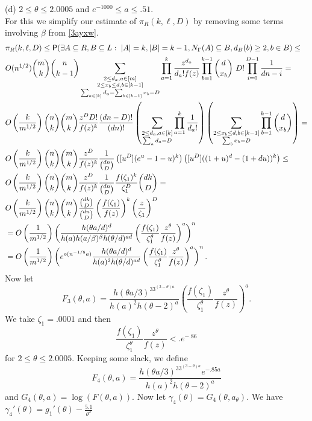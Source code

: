 \documentclass[11pt]{article}
\def\b{\beta}
\def\g{\gamma}
\def\G{\Gamma}
\def\z{\zeta}
\def\th{\theta}
\def\p{\pi}
\def\Pr{{\sf P}}
\newcommand{\brac}[1]{\left(#1\right)}
\newcommand{\bfrac}[2]{\brac{\frac{#1}{#2}}}
\begin{document}
(d) $2\leq \th\leq 2.0005$ and $e^{-1000}\leq a\leq .51$.\\ 
For this we simplify our estimate of $\p_R(k,\ell,D)$ by removing some terms involving $\b$ from \eqref{3ayxw}.
\begin{align}
&\p_R(k,\ell,D)\leq\Pr(\exists A\subseteq R,B\subseteq L:\;|A|=k,|B|=k-1,N_\G(A)\subseteq B,d_B(b)\geq 2,b\in B)\leq \nonumber\\
&O(n^{1/2})\binom{m}{k}\binom{n}{k-1}\sum_{\substack{2\leq  d_a,a\in[m]\\2\leq x_b\leq d,b\in[k-1]\\
\sum_{a\in [k]}d_a=\sum_{b\in [k-1]}x_b=D}}\prod_{a=1}^k\frac{z^{d_a}}{d_a!f(z)}
\prod_{b=1}^{k-1}\binom{d}{x_b}\ D!\prod_{i=0}^{D-1}\frac{1}{dn-i}=\nonumber\\
&O\bfrac{k}{m^{1/2}}\binom{n}{k}\binom{m}{k}\frac{z^{D}D!}{f(z)^k}\frac{(dn-D)!}{(dn)!}
\brac{\sum_{\substack{2\leq  d_a,a\in[k]\\\sum_ad_a=D}}\prod_{a=1}^k\frac{1}{d_a!}}
\brac{\sum_{\substack{2\leq x_b\leq d,b\in[k-1]\\\sum_bx_b=D}}\prod_{b=1}^{k-1}\binom{d}{x_b}}=\nonumber\\
&O\bfrac{k}{m^{1/2}}\binom{n}{k}\binom{m}{k}\frac{z^D}{f(z)^k}\frac{1}{\binom{dn}{D}}
\brac{[u^D](e^u-1-u)^k}\brac{[u^D]((1+u)^d-(1+du))^k}\leq\nonumber\\
&O\bfrac{k}{m^{1/2}}\binom{n}{k}\binom{m}{k}\frac{z^D}{f(z)^k}\frac{1}{\binom{dn}{D}}\frac{f(\z_1)^k}{\z_1^D}
\binom{dk}{D}=\nonumber\\
&O\bfrac{k}{m^{1/2}}\binom{n}{k}\binom{m}{k}\frac{\binom{dk}{D}}{\binom{dn}{D}}
\bfrac{f(\z_1)}{f(z)}^k\bfrac{z}{\z_1}^D\nonumber\\
&=O\bfrac{1}{m^{1/2}}\brac{\frac{h(\th a/d)^d}{h(a)h(a/\b)^\b h(\th/d)^{ad}}\brac{\frac{f(\z_1)}{\z_1^\th} 
\frac{z^\th}{f(z)}}^a}^n\nonumber\\
&=O\bfrac{1}{m^{1/2}}\brac{e^{o(n^{-1/8}a)}\frac{h(\th a/d)^d}{h(a)^2 h(\th/d)^{ad}}\brac{\frac{f(\z_1)}{\z_1^\th} 
\frac{z^\th}{f(z)}}^a}^n.\label{3axxx}
\end{align}
Now let
$$F_3(\th,a)=\frac{h(\th a/3)^33^{(3-\th)a}}{h(a)^2h(\th-2)^a}
\brac{\frac{f(\z_1)}{\z_1^\th}\frac{z^\th}{f(z)}}^a.$$ 
We take $\z_1=.0001$ and then 
$$\frac{f(\z_1)}{\z_1^\th}\frac{z^\th}{f(z)}<.e^{-.86}$$ 
for $2\leq \th\leq 2.0005$. 
Keeping some slack, we define 
$$F_4(\th,a)=\frac{h(\th a/3)^33^{(3-\th)a}e^{-.85a}}{h(a)^2h(\th-2)^a}$$
and $G_4(\th,a)=\log(F(\th,a))$.
Now let $\g_4(\th)=G_4(\th,a_\th)$. We have $\g_4'(\th)=g_1'(\th)-\frac{5.1}{\th^2}$ 
\end{document}
